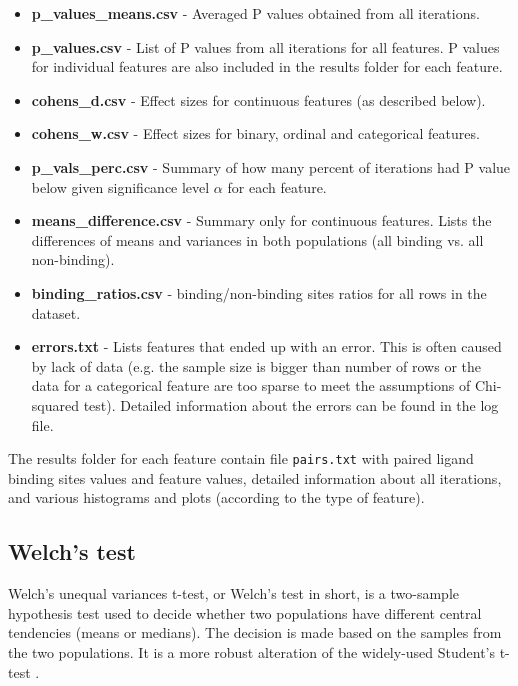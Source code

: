 \begin{itemize}
\item \textbf{p\_values\_means.csv} - Averaged P values obtained from all iterations.
\item \textbf{p\_values.csv} - List of P values from all iterations for all features. P values for individual features are also included in the results folder for each feature.
\item \textbf{cohens\_d.csv} - Effect sizes for continuous features (as described below).
\item \textbf{cohens\_w.csv} - Effect sizes for binary, ordinal and categorical features.
\item \textbf{p\_vals\_perc.csv} - Summary of how many percent of iterations had P value below given significance level $\alpha$ for each feature.
\item \textbf{means\_difference.csv} - Summary only for continuous features. Lists the differences of means and variances in both populations (all binding vs. all non-binding).
\item \textbf{binding\_ratios.csv} - binding/non-binding sites ratios for all rows in the dataset.
\item \textbf{errors.txt} - Lists features that ended up with an error. This is often caused by lack of data (e.g. the sample size is bigger than number of rows or the data for a categorical feature are too sparse to meet the assumptions of Chi-squared test). Detailed information about the errors can be found in the log file.
\end{itemize}

The results folder for each feature contain file \texttt{pairs.txt} with paired ligand binding sites values and feature values, detailed information about all iterations, and various histograms and plots (according to the type of feature). 


\subsection{Welch's test} \label{s:welchs}

Welch's unequal variances t-test, or Welch's test in short, is a two-sample hypothesis test used to decide whether two populations have different central tendencies (means or medians). The decision is made based on the samples from the two populations. It is a more robust alteration of the widely-used Student's t-test \cite{welch}.

